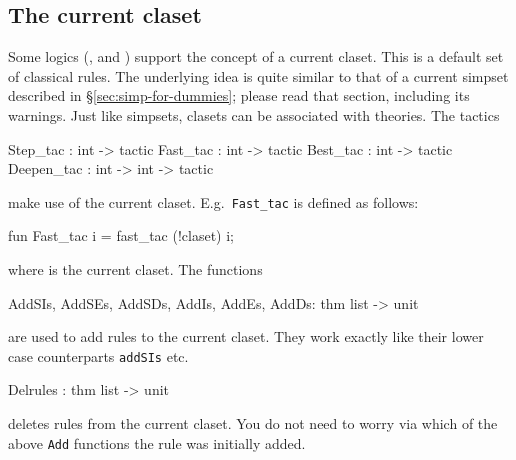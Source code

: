 \subsection{The current claset}
Some logics (\FOL, {\HOL} and \ZF) support the concept of a current
claset.  This is a default set of classical rules.  The
underlying idea is quite similar to that of a current simpset described in
\S\ref{sec:simp-for-dummies}; please read that section, including its
warnings.  Just like simpsets, clasets can be associated with theories.  The
tactics
\begin{ttbox}
Step_tac     : int -> tactic
Fast_tac     : int -> tactic
Best_tac     : int -> tactic
Deepen_tac   : int -> int -> tactic
\end{ttbox}
  
make use of the current claset. E.g.~{\tt Fast_tac} is defined as follows:
\begin{ttbox}
fun Fast_tac i = fast_tac (!claset) i;
\end{ttbox}
where  is the current claset.
The functions
\begin{ttbox}
AddSIs, AddSEs, AddSDs, AddIs, AddEs, AddDs: thm list -> unit
\end{ttbox}
  
  
are used to add rules to the current claset. They work exactly like their
lower case counterparts {\tt addSIs} etc.
\begin{ttbox}
Delrules : thm list -> unit
\end{ttbox}
deletes rules from the current claset. You do not need to worry via which of
the above {\tt Add} functions the rule was initially added.

